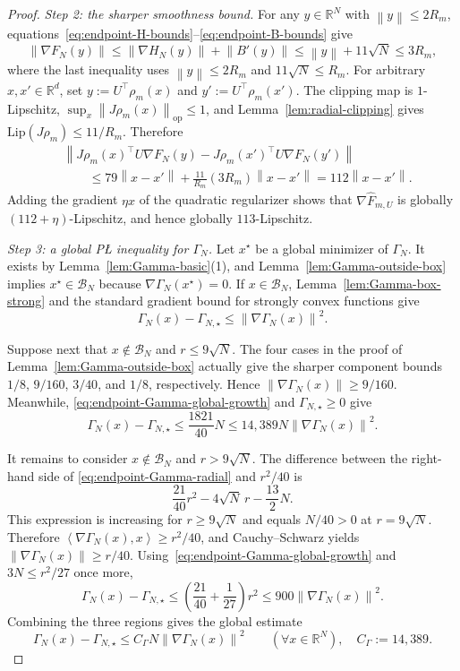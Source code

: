 \documentclass[10pt,a4paper]{amsart}
\newcommand{\R}{\mathbb{R}}
\newcommand{\ip}[2]{\left\langle #1,#2\right\rangle}
\newcommand{\norm}[1]{\left\lVert #1\right\rVert}
\begin{document}
\begin{proof}
\emph{Step 2: the sharper smoothness bound.}
For any $y\in\R^N$ with $\norm{y}\le2R_m$, equations~\eqref{eq:endpoint-H-bounds}--\eqref{eq:endpoint-B-bounds}
give
\[
\norm{\nabla F_N(y)}
\le
\norm{\nabla H_N(y)}+\norm{B'(y)}
\le
\norm{y}+11\sqrt N
\le
3R_m,
\]
where the last inequality uses $\norm{y}\le2R_m$ and $11\sqrt N\le R_m$. For arbitrary $x,x'\in\R^d$, set
$y:=U^\top\rho_m(x)$ and $y':=U^\top\rho_m(x')$. The clipping map is $1$-Lipschitz,
$\sup_x\norm{J\rho_m(x)}_{\mathrm{op}}\le1$, and Lemma~\ref{lem:radial-clipping} gives
$\mathrm{Lip}(J\rho_m)\le11/R_m$. Therefore
\begin{align*}
&\norm{J\rho_m(x)^\top U\nabla F_N(y)-J\rho_m(x')^\top U\nabla F_N(y')}\\
&\qquad\le
79\norm{x-x'}+\frac{11}{R_m}(3R_m)\norm{x-x'}
=112\norm{x-x'}.
\end{align*}
Adding the gradient $\eta x$ of the quadratic regularizer shows that $\nabla\widehat F_{m,U}$ is globally
$(112+\eta)$-Lipschitz, and hence globally $113$-Lipschitz.

\emph{Step 3: a global P\L{} inequality for $\Gamma_N$.}
Let $x^\star$ be a global minimizer of $\Gamma_N$. It exists by Lemma~\ref{lem:Gamma-basic}(1), and
Lemma~\ref{lem:Gamma-outside-box} implies $x^\star\in\mathcal B_N$ because
$\nabla\Gamma_N(x^\star)=0$. If $x\in\mathcal B_N$, Lemma~\ref{lem:Gamma-box-strong} and the standard gradient
bound for strongly convex functions give
\[
\Gamma_N(x)-\Gamma_{N,\star}\le\norm{\nabla\Gamma_N(x)}^2.
\]

Suppose next that $x\notin\mathcal B_N$ and $r\le9\sqrt N$. The four cases in the proof of
Lemma~\ref{lem:Gamma-outside-box} actually give the sharper component bounds
$1/8$, $9/160$, $3/40$, and $1/8$, respectively. Hence
$\norm{\nabla\Gamma_N(x)}\ge9/160$. Meanwhile,
\eqref{eq:endpoint-Gamma-global-growth} and $\Gamma_{N,\star}\ge0$ give
\[
\Gamma_N(x)-\Gamma_{N,\star}
\le\frac{1821}{40}N
\le14{,}389N\norm{\nabla\Gamma_N(x)}^2.
\]

It remains to consider $x\notin\mathcal B_N$ and $r>9\sqrt N$. The difference between the right-hand side of
\eqref{eq:endpoint-Gamma-radial} and $r^2/40$ is
\[
\frac{21}{40}r^2-4\sqrt N\,r-\frac{13}{2}N.
\]
This expression is increasing for $r\ge9\sqrt N$ and equals $N/40>0$ at $r=9\sqrt N$. Therefore
$\ip{\nabla\Gamma_N(x)}{x}\ge r^2/40$, and Cauchy--Schwarz yields
$\norm{\nabla\Gamma_N(x)}\ge r/40$. Using~\eqref{eq:endpoint-Gamma-global-growth} and
$3N\le r^2/27$ once more,
\[
\Gamma_N(x)-\Gamma_{N,\star}
\le
\left(\frac{21}{40}+\frac{1}{27}\right)r^2
\le900\norm{\nabla\Gamma_N(x)}^2.
\]
Combining the three regions gives the global estimate
\begin{equation}
\label{eq:endpoint-Gamma-global-PL}
\Gamma_N(x)-\Gamma_{N,\star}
\le
C_\Gamma N\norm{\nabla\Gamma_N(x)}^2
\qquad(\forall x\in\R^N),
\quad
C_\Gamma:=14{,}389.
\end{equation}


\end{proof}
\end{document}

